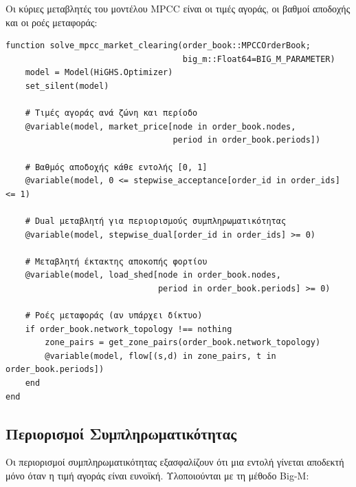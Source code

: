 Οι κύριες μεταβλητές του μοντέλου MPCC είναι οι τιμές αγοράς, οι βαθμοί αποδοχής και οι ροές μεταφοράς:

\begin{samepage}
\begin{verbatim}
function solve_mpcc_market_clearing(order_book::MPCCOrderBook; 
                                    big_m::Float64=BIG_M_PARAMETER)
    model = Model(HiGHS.Optimizer)
    set_silent(model)
    
    # Τιμές αγοράς ανά ζώνη και περίοδο
    @variable(model, market_price[node in order_book.nodes, 
                                  period in order_book.periods])
    
    # Βαθμός αποδοχής κάθε εντολής [0, 1]
    @variable(model, 0 <= stepwise_acceptance[order_id in order_ids] <= 1)
    
    # Dual μεταβλητή για περιορισμούς συμπληρωματικότητας
    @variable(model, stepwise_dual[order_id in order_ids] >= 0)
    
    # Μεταβλητή έκτακτης αποκοπής φορτίου
    @variable(model, load_shed[node in order_book.nodes, 
                               period in order_book.periods] >= 0)
    
    # Ροές μεταφοράς (αν υπάρχει δίκτυο)
    if order_book.network_topology !== nothing
        zone_pairs = get_zone_pairs(order_book.network_topology)
        @variable(model, flow[(s,d) in zone_pairs, t in order_book.periods])
    end
end
\end{verbatim}
\end{samepage}

\subsection{Περιορισμοί Συμπληρωματικότητας}
\label{subsec:complementarity-constraints}

Οι περιορισμοί συμπληρωματικότητας εξασφαλίζουν ότι μια εντολή γίνεται αποδεκτή μόνο όταν η τιμή αγοράς είναι ευνοϊκή. Υλοποιούνται με τη μέθοδο Big-M:

